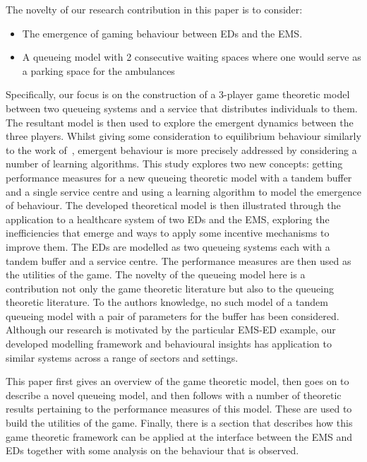 The novelty of our research contribution in this paper is to consider:
\begin{itemize}
    \item The emergence of gaming behaviour between EDs and the EMS.
    \item A queueing model with 2 consecutive waiting spaces where one would 
    serve as a parking space for the ambulances
\end{itemize}
Specifically, our focus is on the construction of a 3-player game theoretic 
model between two queueing systems and a service that distributes individuals
to them. 
The resultant model is then used to explore the emergent dynamics between 
the three players.
Whilst giving some consideration to equilibrium behaviour similarly to the 
work of~\cite{FirmCompetition, FirmCompetition2, deo2011centralized, 
veltman2005equilibrium}, emergent behaviour is more precisely addressed by 
considering a number of learning algorithms.
This study explores two new concepts: getting performance measures for a new
queueing theoretic model with a tandem buffer and a single service centre and 
using a learning algorithm to model the emergence of behaviour.
The developed theoretical model is then illustrated through the application to 
a healthcare system of two EDs and the EMS, exploring the inefficiencies that 
emerge and ways to apply some incentive mechanisms to improve them.
The EDs are modelled as two queueing systems each with a tandem buffer and a 
service centre. 
The performance measures are then used as the utilities of the game.
The novelty of the queueing model here is a contribution not only the game 
theoretic literature but also to the queueing theoretic literature.
To the authors knowledge, no such model of a tandem queueing model with a pair 
of parameters for the buffer has been considered.
Although our research is motivated by the particular EMS-ED example, our 
developed modelling framework and behavioural insights has application to 
similar systems across a range of sectors and settings. 

This paper first gives an overview of the game theoretic model, then goes on 
to describe a novel queueing model, and then follows with a number of theoretic 
results pertaining to the performance measures of this model. 
These are used to build the utilities of the game.
Finally, there is a section that describes how this game theoretic framework
can be applied at the interface between the EMS and EDs together with some 
analysis on the behaviour that is observed.
